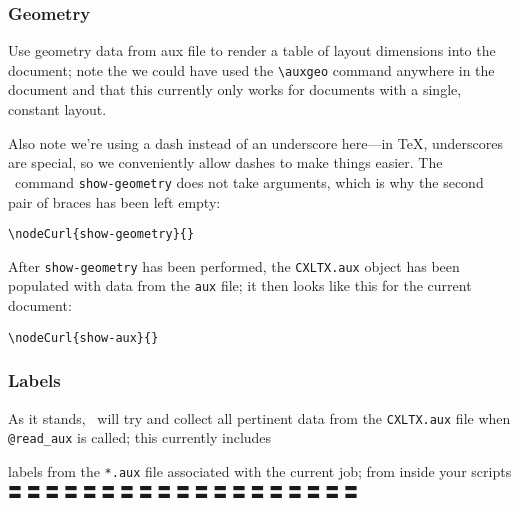 \subsubsection{Geometry}\label{geo}


\auxgeo

Use geometry data from aux file to render a table of layout dimensions into the document;
note the we could have used the \verb#\auxgeo# command anywhere in the document and that
this currently only works for documents with a single, constant layout.

Also note we're using a dash instead of an underscore here---in \TeX, underscores are special, so
we conveniently allow dashes to make things easier. The \CXLTX\ command \verb#show-geometry# does
not take arguments, which is why the second pair of braces has been left empty:

\begin{verbatim}
\nodeCurl{show-geometry}{}
\end{verbatim}


After \verb#show-geometry# has been performed, the \verb#CXLTX.aux# object has been populated with data from the
\verb#aux# file; it then looks like this for the current document:


\begin{verbatim}
\nodeCurl{show-aux}{}
\end{verbatim}



\subsubsection{Labels}\label{labels}

As it stands, \CXLTX\ will try and collect all pertinent data from the \verb#CXLTX.aux# file when
\verb#@read_aux# is called; this currently includes

labels from the \verb#*.aux# file associated with the current job; from
inside your scripts 〓 〓 〓 〓 〓 〓 〓 〓 〓 〓 〓 〓 〓 〓 〓 〓 〓 〓 〓

